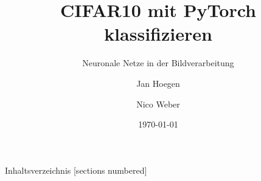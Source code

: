\documentclass[
  fontsize=10pt, 
  aspectratio=169,
  xcolor={dvipsnames}
]{beamer}
\title{CIFAR10 mit PyTorch klassifizieren}
\subtitle{Neuronale Netze in der Bildverarbeitung}
\date{\today}
\author{Jan Hoegen \and Nico Weber}
\institute{
  Hochschule Karlsruhe\\
  University of Applied Sciences
}
\begin{document}
  \maketitle

  \begin{frame}{Inhaltsverzeichnis}
    [sections numbered]
    \tableofcontents[hideallsubsections]
  \end{frame}

  

  

  

  










\end{document}
